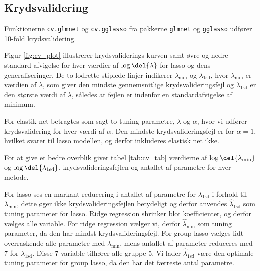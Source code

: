 \subsection{Krydsvalidering}
Funktionerne \texttt{cv.glmnet} og \texttt{cv.gglasso} fra pakkerne \texttt{glmnet} og \texttt{gglasso} udfører 10-fold krydsvalidering.

Figur \ref{fig:cv_plot} illustrerer krydsvaliderings kurven samt øvre og nedre standard afvigelse for hver værdier af $\log \del{\lambda}$ for lasso og dens generaliseringer. 
De to lodrette stiplede linjer indikerer \(\lambda_{\text{min}}\) og \(\lambda_\text{1sd}\), hvor \(\lambda_{\text{min}}\) er værdien af \(\lambda\), som giver den mindste gennemsnitlige krydsvalideringsfejl og \(\lambda_\text{1sd}\) er den største værdi af \(\lambda\), således at fejlen er indenfor en standardafvigelse af minimum. 

For elastik net betragtes som sagt to tuning parametre, \(\lambda\) og \(\alpha\), hvor vi udfører krydsvalidering for hver værdi af \(\alpha\). 
Den mindste krydsvalideringsfejl er for $\alpha =1$, hvilket svarer til lasso modellen, og derfor inkluderes elastisk net ikke. 
%
%



For at give et bedre overblik giver tabel \ref{tab:cv_tab} værdierne af $\log \del{ \lambda_{\min}}$ og $\log \del{ \lambda_{1\text{sd}}}$, krydsvalideringsfejlen og antallet af parametre for hver metode.

For lasso ses en markant reducering i antallet af parametre for $\lambda_{1\text{sd}}$ i forhold til $\lambda_{\min}$, dette øger ikke krydsvalideringsfejlen betydeligt og derfor anvendes $\widehat{\lambda}_{1\text{sd}}$ som tuning parameter for lasso. 
Ridge regression shrinker blot koefficienter, og derfor vælges alle variable.
For ridge regression vælger vi, derfor $\widehat{\lambda}_{\min}$ som tuning parameter, da den har mindst krydsvalideringsfejl.
For group lasso vælges lidt overraskende alle parametre med \(\lambda_\text{min}\), mens antallet af parameter reduceres med 7 for $\lambda_{1\text{sd}}$. Disse 7 variable tilhører alle gruppe 5.
Vi lader $\widehat{\lambda}_{1\text{sd}}$ være den optimale tuning parameter for group lasso, da den har det færreste antal parametre. 

